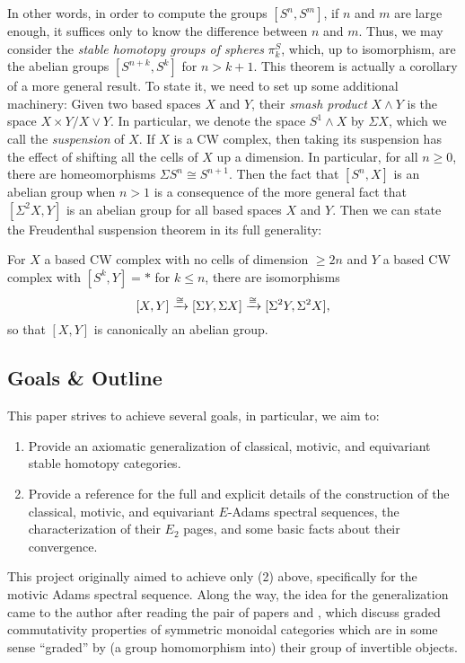 \documentclass[../main.tex]{subfiles}
\begin{document}
In other words, in order to compute the groups $[S^n,S^m]$, if $n$ and $m$ are large enough, it suffices only to know the difference between $n$ and $m$. Thus, we may consider the \emph{stable homotopy groups of spheres} $\pi^S_k$, which, up to isomorphism, are the abelian groups $[S^{n+k},S^k]$ for $n>k+1$. This theorem is actually a corollary of a more general result. To state it, we need to set up some additional machinery: Given two based spaces $X$ and $Y$, their \emph{smash product} $X\wedge Y$ is the space $X\times Y/X\vee Y$. In particular, we denote the space $S^1\wedge X$ by $\Sigma X$, which we call the \emph{suspension} of $X$. If $X$ is a CW complex, then taking its suspension has the effect of shifting all the cells of $X$ up a dimension. In particular, for all $n\geq0$, there are homeomorphisms $\Sigma S^n\cong S^{n+1}$. Then the fact that $[S^n,X]$ is an abelian group when $n>1$ is a consequence of the more general fact that $[\Sigma^2X,Y]$ is an abelian group for all based spaces $X$ and $Y$. Then we can state the Freudenthal suspension theorem in its full generality:

\begin{theorem}
    For $X$ a based CW complex with no cells of dimension $\geq 2n$ and $Y$ a based CW complex with $[S^k,Y]=*$ for $k\leq n$, there are isomorphisms
    \[[X,Y]\xrightarrow\cong[\Sigma Y,\Sigma X]\xrightarrow\cong[\Sigma^2Y,\Sigma^2X],\]
    so that $[X,Y]$ is canonically an abelian group.
\end{theorem}


\subsection{Goals \& Outline}

This paper strives to achieve several goals, in particular, we aim to:
\begin{enumerate}
    \item Provide an axiomatic generalization of classical, motivic, and equivariant stable homotopy categories.
    \item Provide a reference for the full and explicit details of the construction of the classical, motivic, and equivariant $E$-Adams spectral sequences, the characterization of their $E_2$ pages, and some basic facts about their convergence.
\end{enumerate}
This project originally aimed to achieve only (2) above, specifically for the motivic Adams spectral sequence. Along the way, the idea for the generalization came to the author after reading the pair of papers \cite{Dugger_2014} and \cite{DDIO}, which discuss graded commutativity properties of symmetric monoidal categories which are in some sense ``graded'' by (a group homomorphism into) their group of invertible objects.
\end{document}
